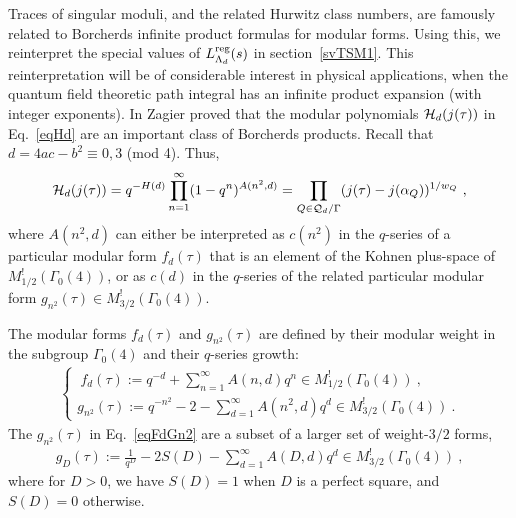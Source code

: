 \documentclass[11pt,a4paper]{article}
\newcommand{\G}{\Gamma}
\newcommand{\reg}{{\rm reg}}
\begin{document}
Traces of singular moduli, and the related Hurwitz class numbers, are famously related to Borcherds infinite product formulas for modular forms. Using this, we reinterpret the special values of $L_{\Lambda_d}^\reg(s)$ in section~\ref{svTSM1}. This reinterpretation will be of considerable interest in physical applications, when the quantum field theoretic path integral has an infinite product expansion (with integer exponents). In \cite{02-TSM} Zagier proved that the modular polynomials ${\cal H}_d(j(\tau))$ in Eq.~\eqref{eqHd} are an important class of Borcherds products. Recall that $d = 4 ac - b^2 \equiv 0,3$ (mod 4). Thus, 
\begin{align}
{\cal H}_d(j(\tau)) = q^{-H(d)} \prod_{n = 1}^{\infty} (1-q^n)^{A(n^2,d)} = \prod_{Q \in {\cal Q}_d/\G} (j(\tau)-j(\alpha_Q))^{1/w_Q}~, \label{eqBZ1}
\end{align} 
where $A(n^2,d)$ can either be interpreted as $c(n^2)$ in the $q$-series of a particular modular form $f_d(\tau)$ that is an element of the Kohnen plus-space of $M_{1/2}^{!}(\G_0(4))$, or as $c(d)$ in the $q$-series of the related particular modular form $g_{n^2}(\tau) \in M_{3/2}^{!}(\G_0(4))$. 

The modular forms $f_d(\tau)$ and $g_{n^2}(\tau)$ are defined by their modular weight in the subgroup $\G_0(4)$ and their $q$-series growth:
\begin{align}
\begin{cases}
~f_d(\tau) := q^{-d} + \sum_{n = 1}^{\infty} A(n,d) q^n \in M_{1/2}^{!}(\G_0(4))~, \\
g_{n^2}(\tau) := q^{-n^2} - 2- \sum_{d = 1}^{\infty} A(n^2,d) q^d \in M_{3/2}^{!}(\G_0(4))~. \label{eqFdGn2}
\end{cases}
\end{align}
The $g_{n^2}(\tau)$ in Eq.~\eqref{eqFdGn2} are a subset of a larger set of weight-$3/2$ forms,
\begin{align}
g_D(\tau) := \frac{1}{q^D} - 2 S(D)- \sum_{d = 1}^{\infty} A(D,d) q^d \in M_{3/2}^{!}(\G_0(4))~, \label{eqGd}
\end{align}
where for $D > 0$, we have $S(D) = 1$ when $D$ is a perfect square, and $S(D) = 0$ otherwise.
\end{document}
